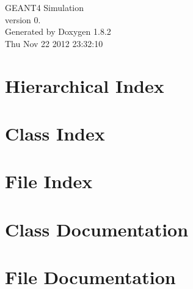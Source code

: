 \documentclass{book}
\begin{document}
\hypersetup{pageanchor=false,citecolor=blue}
\begin{titlepage}
\vspace*{7cm}
\begin{center}
{\Large G\-E\-A\-N\-T4 Simulation \\[1ex]\large version 0. }\\
\vspace*{1cm}
{\large Generated by Doxygen 1.8.2}\\
\vspace*{0.5cm}
{\small Thu Nov 22 2012 23:32:10}\\
\end{center}
\end{titlepage}
\clearemptydoublepage
{}
\tableofcontents
\clearemptydoublepage
{}
\hypersetup{pageanchor=true,citecolor=blue}
\chapter{Hierarchical Index}

\chapter{Class Index}

\chapter{File Index}

\chapter{Class Documentation}












\chapter{File Documentation}




























\printindex
\end{document}

